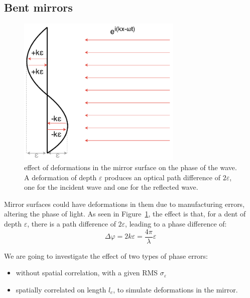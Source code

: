\documentclass{article}
\newcommand{\eps}{\varepsilon}
\newcommand{\ph}{\varphi}
\begin{document}
\subsection{Bent mirrors}\label{sec:analysis:bent}
\begin{figure}
    \centering
    \begin{minipage}{0.5\textwidth}
        \centering
        \includegraphics[width=0.7\textwidth]{pictures/mirror_dent.pdf}
    \end{minipage}%
    \hfill
    \begin{minipage}{0.4\textwidth}
        \caption{effect of deformations in the mirror surface on the phase of the wave. A deformation of depth $\eps$ produces an optical path difference of $2\eps$, one for the incident wave and one for the reflected wave.}\label{fig:bend}
    \end{minipage}
\end{figure}

Mirror surfaces could have deformations in them due to manufacturing errors, altering the phase of light. As seen in Figure~\ref{fig:bend}, the effect is that, for a dent of depth $\eps$, there is a path difference of $2\eps$, leading to a phase difference of:
\begin{equation}
    \Delta\ph = 2k\eps = \frac{4\pi}{\lambda}\eps
\end{equation}

We are going to investigate the effect of two types of phase errors:
\begin{itemize}
    \item without spatial correlation, with a given RMS $\sigma_\eps$
    \item spatially correlated on length $l_c$, to simulate deformations in the mirror.
\end{itemize}
\end{document}
